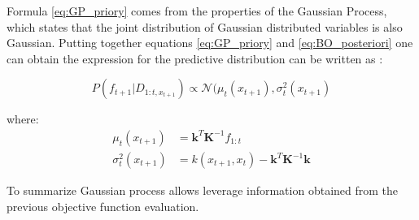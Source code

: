 Formula \ref{eq:GP_priory} comes from the properties of the Gaussian Process, which states that the joint distribution of Gaussian distributed variables is also Gaussian. Putting together equations \ref{eq:GP_priory} and \ref{eq:BO_posteriori} one can obtain the expression for the predictive distribution can be written as \cite{GaussianProcesses}: 

\begin{equation}
    P(f_{t+1}|D_{1:t, x_{t+1}}) \propto \mathcal{N} (\mu_{t}(x_{t+1}), \sigma_{t}^{2}(x_{t+1}) 
\end{equation}

where: 
\begin{equation*}
\begin{aligned}
    \mu_{t}(x_{t+1}) &= \mathbf{k}^{T}\mathbf{K}^{-1}f_{1:t} \\
     \sigma_{t}^{2}(x_{t+1}) &= k(x_{t+1},x_t) - \mathbf{k}^{T}\mathbf{K}^{-1}\mathbf{k}
     \end{aligned}
\end{equation*}

To summarize Gaussian process allows leverage information obtained from the previous objective function evaluation.


